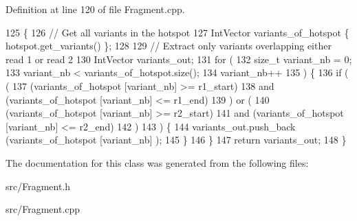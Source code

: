 Definition at line 120 of file Fragment.\+cpp.


\begin{DoxyCode}
125 \{
126     \textcolor{comment}{// Get all variants in the hotspot}
127     IntVector variants\_of\_hotspot \{ hotspot.get\_variants() \};
128     
129     \textcolor{comment}{// Extract only variants overlapping either read 1 or read 2}
130     IntVector variants\_out;
131     \textcolor{keywordflow}{for} (
132             \textcolor{keywordtype}{size\_t} variant\_nb = 0; 
133             variant\_nb < variants\_of\_hotspot.size(); 
134             variant\_nb++
135         ) \{
136         \textcolor{keywordflow}{if} ( ( 
137                 (variants\_of\_hotspot [variant\_nb] >= r1\_start) 
138                 and (variants\_of\_hotspot [variant\_nb] <= r1\_end) 
139              ) or (
140                  (variants\_of\_hotspot [variant\_nb] >= r2\_start) 
141                  and (variants\_of\_hotspot [variant\_nb] <= r2\_end)
142              )
143            ) \{
144             variants\_out.push\_back (variants\_of\_hotspot [variant\_nb] );
145         \}
146     \}
147     \textcolor{keywordflow}{return} variants\_out;
148 \}
\end{DoxyCode}


The documentation for this class was generated from the following files\+:\begin{DoxyCompactItemize}
\item 
src/Fragment.\+h\item 
src/Fragment.\+cpp\end{DoxyCompactItemize}

